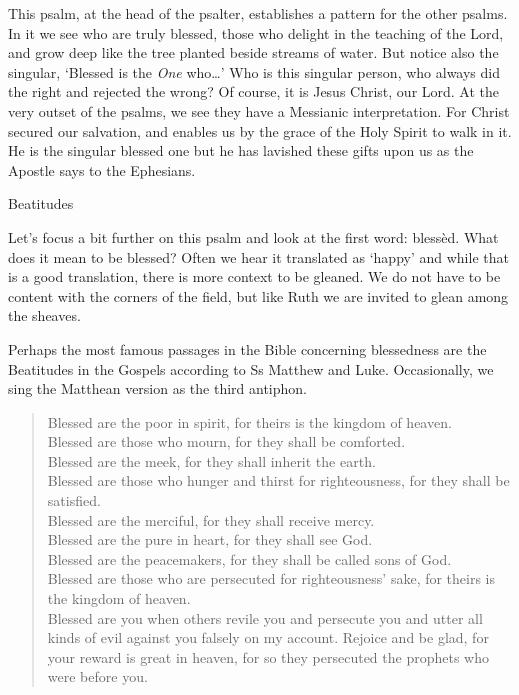 \documentclass[
]{article}
\newcommand{\RL}[1]{\beginR #1\endR}
\begin{document}
This psalm, at the head of the psalter, establishes a pattern for the
other psalms. In it we see who are truly blessed, those who delight in
the teaching of the Lord, and grow deep like the tree planted beside
streams of water. But notice also the singular, `Blessed is the
\emph{One} who\ldots{}' Who is this singular person, who always did the
right and rejected the wrong? Of course, it is Jesus Christ, our Lord.
At the very outset of the psalms, we see they have a Messianic
interpretation. For Christ secured our salvation, and enables us by the
grace of the Holy Spirit to walk in it. He is the singular blessed one
but he has lavished these gifts upon us as the Apostle says to the
Ephesians.

Beatitudes

Let's focus a bit further on this psalm and look at the first word:
blessèd. What does it mean to be blessed? Often we hear it translated as
`happy' and while that is a good translation, there is more context to
be gleaned. We do not have to be content with the corners of the field,
but like Ruth we are invited to glean among the sheaves.

Perhaps the most famous passages in the Bible concerning blessedness are
the Beatitudes in the Gospels according to Ss Matthew and Luke.
Occasionally, we sing the Matthean version as the third antiphon.

\begin{quote}
Blessed are the poor in spirit, for theirs is the kingdom of heaven.\\
Blessed are those who mourn, for they shall be comforted.\\
Blessed are the meek, for they shall inherit the earth.\\
Blessed are those who hunger and thirst for righteousness, for they
shall be satisfied.\\
Blessed are the merciful, for they shall receive mercy.\\
Blessed are the pure in heart, for they shall see God.\\
Blessed are the peacemakers, for they shall be called sons of God.\\
Blessed are those who are persecuted for righteousness\RL{'} sake, for
theirs is the kingdom of heaven.\\
Blessed are you when others revile you and persecute you and utter all
kinds of evil against you falsely on my account. Rejoice and be glad,
for your reward is great in heaven, for so they persecuted the prophets
who were before you.
\end{quote}
\end{document}
